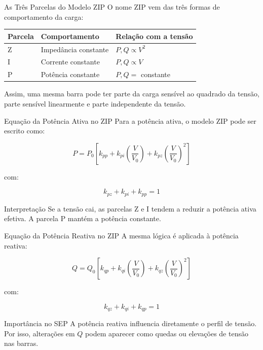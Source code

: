 \documentclass[aspectratio=169,11pt]{beamer}
\begin{document}
\begin{frame}{As Três Parcelas do Modelo ZIP}
  O nome ZIP vem das três formas de comportamento da carga:

  \begin{table}
    \centering
    \begin{tabular}{lll}
      \toprule
      Parcela & Comportamento & Relação com a tensão \\
      \midrule
      Z & Impedância constante & $P,Q \propto V^2$ \\
      I & Corrente constante & $P,Q \propto V$ \\
      P & Potência constante & $P,Q =$ constante \\
      \bottomrule
    \end{tabular}
  \end{table}

  \vspace{0.2cm}
  Assim, uma mesma barra pode ter parte da carga sensível ao quadrado da tensão, parte sensível linearmente e parte independente da tensão.
\end{frame}

\begin{frame}{Equação da Potência Ativa no ZIP}
  Para a potência ativa, o modelo ZIP pode ser escrito como:

  \[
    P = P_0 \left[
      k_{pp}
      + k_{pi}\left(\frac{V}{V_0}\right)
      + k_{pz}\left(\frac{V}{V_0}\right)^2
    \right]
  \]

  com:

  \[
    k_{pz} + k_{pi} + k_{pp} = 1
  \]

  \begin{block}{Interpretação}
    Se a tensão cai, as parcelas Z e I tendem a reduzir a potência ativa efetiva. A parcela P mantém a potência constante.
  \end{block}
\end{frame}

\begin{frame}{Equação da Potência Reativa no ZIP}
  A mesma lógica é aplicada à potência reativa:

  \[
    Q = Q_0 \left[
      k_{qp}
      + k_{qi}\left(\frac{V}{V_0}\right)
      + k_{qz}\left(\frac{V}{V_0}\right)^2
    \right]
  \]

  com:

  \[
    k_{qz} + k_{qi} + k_{qp} = 1
  \]

  \begin{block}{Importância no SEP}
    A potência reativa influencia diretamente o perfil de tensão. Por isso, alterações em $Q$ podem aparecer como quedas ou elevações de tensão nas barras.
  \end{block}
\end{frame}
\end{document}
